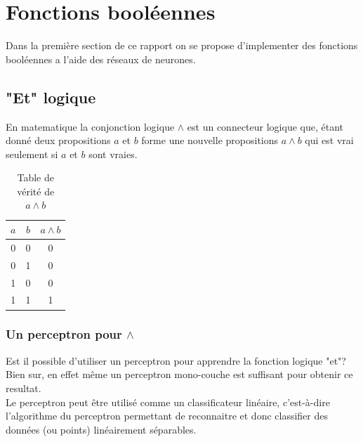 \documentclass[twoside,openright,a4paper,11pt,french]{article}
\begin{document}
\pagestyle{plain}
\setlength{\parindent}{0pt}



\parskip=0pt
\tableofcontents
\clearpage


\vspace{5cm}


\section{Fonctions booléennes}

Dans la première section de ce rapport on se propose
d'implementer des fonctions booléennes a l'aide des réseaux
de neurones. 

\subsection{"Et" logique}

En matematique la conjonction logique $\land$ est un
connecteur logique que, étant donné deux propositions $a$ et $b$
forme une nouvelle propositions $a \land b$ qui est vrai seulement
si $a$ et $b$ sont vraies.

\begin{table}[h]
  \centering
  \begin{tabular}{| c | c | c |}
    \hline
    \textbf{$a$} & \textbf{$b$} & \textbf{$a \land b$}\\
    \hline
    0 & 0  & 0 \\
    \hline
    0 & 1  & 0 \\
    \hline
    1 & 0  & 0 \\
    \hline
    1 & 1  & 1 \\
    \hline
  \end{tabular}
  \caption{Table de vérité de $a \land b$}
  \label{tab:et}
\end{table}




\subsubsection{Un perceptron pour $\land$} 

Est il possible d'utiliser un perceptron pour apprendre la fonction logique
"et"? Bien sur, en effet même un perceptron mono-couche est suffisant pour
obtenir ce resultat.\\

Le perceptron peut être utilisé comme un classificateur linéaire, c'est-à-dire l'algorithme du
perceptron permettant de reconnaitre et donc classifier des données (ou points)
linéairement séparables.\\
\end{document}

